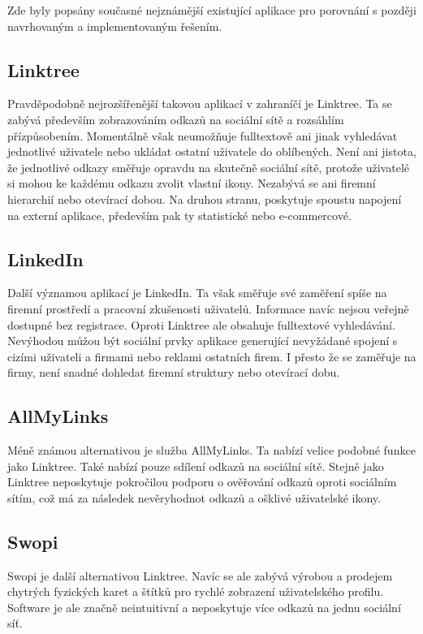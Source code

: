Zde byly popsány současné nejznámější existující aplikace pro porovnání s později navrhovaným a implementovaným řešením.

	\subsection{Linktree}

	Pravděpodobně nejrozšířenější takovou aplikací v zahraníčí je Linktree.
	Ta se zabývá především zobrazováním odkazů na sociální sítě a rozsáhlím přízpůsobením.
	Momentálně však neumožňuje fulltextově ani jinak vyhledávat jednotlivé uživatele nebo ukládat ostatní uživatele
	do oblíbených.
	Není ani jistota, že jednotlivé odkazy směřuje opravdu na skutečně sociální sítě, protože uživatelé si mohou ke každému
	odkazu zvolit vlastní ikony.
	Nezabývá se ani firemní hierarchií nebo otevírací dobou.
	Na druhou stranu, poskytuje spoustu napojení na externí aplikace, především pak ty statistické nebo e-commercové.

	\subsection{LinkedIn}

	Další významou aplikací je LinkedIn.
	Ta však směřuje své zaměření spíše na firemní prostředí a pracovní zkušenosti uživatelů.
	Informace navíc nejsou veřejně dostupné bez registrace.
	Oproti Linktree ale obsahuje fulltextové vyhledávání.
	Nevýhodou můžou být sociální prvky aplikace generující nevyžádané spojení s cizími uživateli a firmami nebo
	reklami ostatních firem.
	I přesto že se zaměřuje na firmy, není snadné dohledat firemní struktury nebo otevírací dobu.


	\subsection{AllMyLinks}

	Méně známou alternativou je služba AllMyLinks.
	Ta nabízí velice podobné funkce jako Linktree.
	Také nabízí pouze sdílení odkazů na sociální sítě.
	Stejně jako Linktree neposkytuje pokročilou podporu o ověřování odkazů oproti sociálním sítím, což má za následek
	nevěryhodnot odkazů a ošklivé uživatelské ikony.

	\subsection{Swopi}

	Swopi je další alternativou Linktree.
	Navíc se ale zabývá výrobou a prodejem chytrých fyzických karet a štítků pro rychlé zobrazení uživatelského profilu.
	Software je ale značně neintuitivní a neposkytuje více odkazů na jednu sociální síť.

